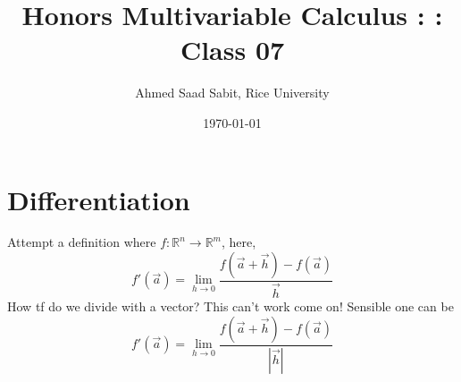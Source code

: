 \documentclass[letter]{article}
\title{Honors Multivariable Calculus : : Class 07}
\author{Ahmed Saad Sabit, Rice University}
\date{\today}
\begin{document}
\maketitle

\section{Differentiation}

	Attempt a definition where $f: \mathbb{R}^{n} \to \mathbb{R}^{m}$, here, 
	\[
	f'(\vec{a}) = \lim_{h \to 0} \frac{f(\vec{a}+\vec{h})-f(\vec{a})}{\vec{h}}
	\] How tf do we divide with a vector? This can't work come on! Sensible one can be
	\[
	f'(\vec{a}) = \lim_{h \to 0} \frac{f(\vec{a}+\vec{h})-f(\vec{a})}{|\vec{h}|}
	\] 
\end{document}
